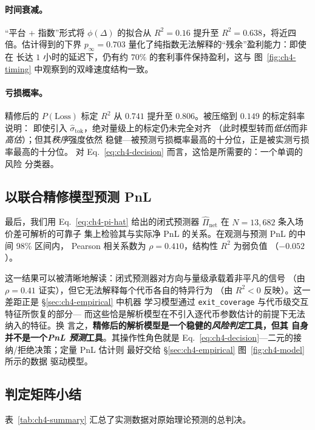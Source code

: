 \documentclass[11pt,a4paper]{ctexart}
\begin{document}
\paragraph{时间衰减。} “平台 + 指数”形式将 $\phi(\Delta)$ 的拟合从
$R^{2}\!=\!0.16$ 提升至 $R^{2}\!=\!0.638$，将近四倍。估计得到的下界
$p_{\infty}\!=\!0.703$ 量化了纯指数无法解释的“残余”盈利能力：即使在
长达 $1$ 小时的延迟下，仍有约 $70\%$ 的套利事件保持盈利，这与
图~\ref{fig:ch4-timing} 中观察到的双峰速度结构一致。

\paragraph{亏损概率。} 精修后的 $P(\text{Loss})$ 标定 $R^{2}$ 从
$0.741$ 提升至 $\mathbf{0.806}$。被压缩到 $0.149$ 的标定斜率说明：
即使引入 $\hat\sigma_{\text{tok}}$，绝对量级上的标定仍未完全对齐
（此时模型转而\emph{低估}而非\emph{高估}）；但其\emph{秩序}强度依然
稳健---被预测亏损概率最高的十分位，正是被实测亏损率最高的十分位。
对 Eq.~\eqref{eq:ch4-decision} 而言，这恰是所需要的：一个单调的风险
分类器。

\subsection{以联合精修模型预测 PnL}

最后，我们用 Eq.~\eqref{eq:ch4-pi-hat} 给出的闭式预测器
$\widehat{\Pi}_{\text{net}}$ 在 $N=13{,}682$ 条入场价差可解析的可靠子
集上检验其与实际净 PnL 的关系。在观测与预测 PnL 的中间 98\% 区间内，
Pearson 相关系数为 $\rho\!=\!0.410$，结构性 $R^{2}$ 为弱负值
（$-0.052$）。

这一结果可以被清晰地解读：闭式预测器对方向与量级承载着非平凡的信号
（由 $\rho\!=\!0.41$ 证实），但它无法解释每个代币各自的特异行为
（由 $R^{2}<0$ 反映）。这一差距正是 \S\ref{sec:ch4-empirical} 中机器
学习模型通过 \texttt{exit\_coverage} 与代币级交互特征所恢复的部分---
而这些恰是解析模型在不引入逐代币参数估计的前提下无法纳入的特征。换
言之，\textbf{精修后的解析模型是一个稳健的\emph{风险判定}工具，但其
自身并不是一个\emph{PnL 预测}工具}。其操作性角色就是
Eq.~\eqref{eq:ch4-decision}---二元的接纳/拒绝决策；定量 PnL 估计则
最好交给 \S\ref{sec:ch4-empirical} 图~\ref{fig:ch4-model} 所示的数据
驱动模型。

\subsection{判定矩阵小结}

表~\ref{tab:ch4-summary} 汇总了实测数据对原始理论预测的总判决。
\end{document}
